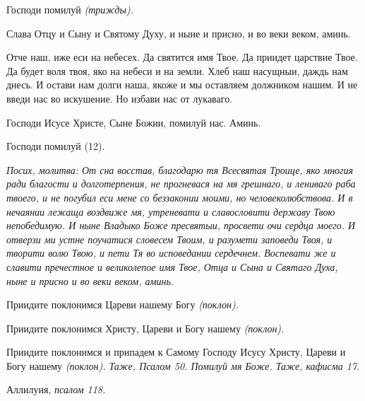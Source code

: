 Господи помилуй \itshape (трижды)\normalfont{}.


Слава Отцу и Сыну и Святому Духу, и ныне и присно, и во веки веком, аминь.


Отче наш, иже еси на небесех. Да святится имя Твое. Да приидет царствие Твое. Да будет воля твоя, яко на небеси и на земли. Хлеб наш насущныи, даждь нам днесь. И остави нам долги наша, якоже и мы оставляем должником нашим. И не введи нас во искушение. Но избави нас от лукаваго.


Господи Исусе Христе, Сыне Божии, помилуй нас. Аминь.


Господи помилуй (12).


\itshape Посих, молитва:\normalfont{} От сна восстав, благодарю тя Всесвятая Троице, яко многия ради благости и долготерпения, не прогневася на мя грешнаго, и лениваго раба твоего, и не погубил еси мене со беззаконии моими, но человеколюбствова. И в нечаянии лежаща воздвиже мя, утреневати и славословити державу Твою непобедимую. И ныне Владыко Боже пресвятыи, просвети очи сердца моего. И отверзи ми устне поучатися словесем Твоим, и разумети заповеди Твоя, и творити волю Твою, и пети Тя во исповедании сердечнем. Воспевати же и славити пречестное и великолепое имя Твое, Отца и Сына и Святаго Духа, ныне и присно и во веки веком, аминь.


Приидите поклонимся Цареви нашему Богу \itshape (поклон)\normalfont{}.


Приидите поклонимся Христу, Цареви и Богу нашему \itshape (поклон)\normalfont{}.


Приидите поклонимся и припадем к Самому Господу Исусу Христу, Цареви и Богу нашему \itshape (поклон)\normalfont{}. \itshape Таже, Псалом 50\normalfont{}. Помилуй мя Боже. \itshape Таже, кафисма 17\normalfont{}.


Аллилуия, \itshape псалом 118\normalfont{}.


